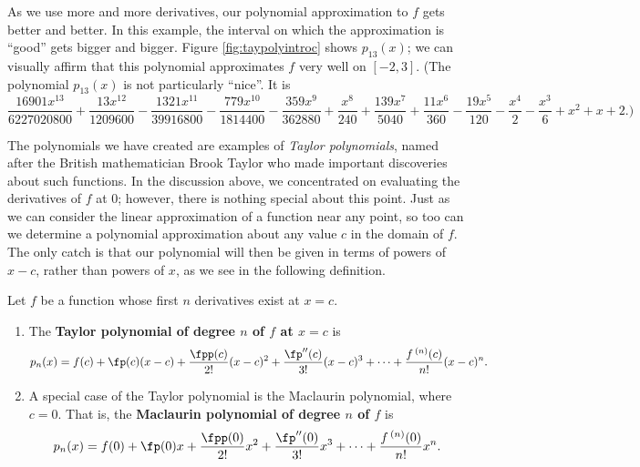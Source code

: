 
As we use more and more derivatives, our polynomial approximation to $f$ gets better and better. In this example, the interval on which the approximation is ``good'' gets bigger and bigger. Figure \ref{fig:taypolyintroc} shows $p_{13}(x)$; we can visually affirm that this polynomial approximates $f$ very well on $[-2,3]$. (The polynomial $p_{13}(x)$ is not particularly ``nice''. It is {\scriptsize 
\[
 \frac{16901x^{13}}{6227020800}+\frac{13x^{12}}{1209600}-\frac{1321x^{11}}{39916800}-\frac{779x^{10}}{1814400}-\frac{359x^9}{362880}+\frac{x^8}{240}+\frac{139x^7}{5040}+\frac{11 x^6}{360}-\frac{19x^5}{120}-\frac{x^4}{2}-\frac{x^3}{6}+x^2+x+2.)
\]}

The polynomials we have created are examples of \emph{Taylor polynomials}, named after the British mathematician Brook Taylor who made important discoveries about such functions. In the discussion above, we concentrated on evaluating the derivatives of $f$ at 0; however, there is nothing special about this point. Just as we can consider the linear approximation of a function near any point, so too can we determine a polynomial approximation about any value $c$ in the domain of $f$. The only catch is that our polynomial will then be given in terms of powers of $x-c$, rather than powers of $x$, as we see in the following definition.

\setboxwidth{50pt}
\noindent\ifthenelse{\isodd{\thepage}}{}{\hskip-50pt}
\noindent\begin{minipage}{\specialboxlength}
{Let $f$ be a function whose first $n$ derivatives exist at $x=c$.
 
\begin{enumerate}
\item		The \textbf{Taylor polynomial of degree $n$ of $f$ at $x=c$} is 
				{
				\[
				p_n(x) = f(c) + \fp(c)(x-c) + \frac{\fpp(c)}{2!}(x-c)^2+\frac{\fp''(c)}{3!}(x-c)^3+\cdots+\frac{f\,^{(n)}(c)}{n!}(x-c)^n.
				\]}

\item		A special case of the Taylor polynomial is the Maclaurin polynomial, where $c=0$. That is, the \textbf{Maclaurin polynomial of degree $n$ of $f$} is 
{
\[
p_n(x) = f(0) + \fp(0)x + \frac{\fpp(0)}{2!}x^2+\frac{\fp''(0)}{3!}x^3+\cdots+\frac{f\,^{(n)}(0)}{n!}x^n.
\]}
\end{enumerate}
}
\end{minipage}
\restoreboxwidth

